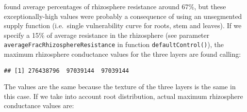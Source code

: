 \documentclass[]{book}
\newenvironment{Shaded}{\begin{snugshade}}{\end{snugshade}}
\newcommand{\KeywordTok}[1]{\textcolor[rgb]{0.13,0.29,0.53}{\textbf{#1}}}
\newcommand{\DecValTok}[1]{\textcolor[rgb]{0.00,0.00,0.81}{#1}}
\newcommand{\StringTok}[1]{\textcolor[rgb]{0.31,0.60,0.02}{#1}}
\newcommand{\OperatorTok}[1]{\textcolor[rgb]{0.81,0.36,0.00}{\textbf{#1}}}
\newcommand{\NormalTok}[1]{#1}
\begin{document}
\citet{Sperry2016a} found average percentages of rhizosphere resistance around 67\%, but these exceptionally-high values were probably a consequence of using an unsegmented supply function (i.e.~single vulnerability curve for roots, stem and leaves). If we specify a 15\% of average resistance in the rhizosphere (see parameter \texttt{averageFracRhizosphereResistance} in function \texttt{defaultControl()}), the maximum rhizosphere conductance values for the three layers are found calling:

\begin{Shaded}
\end{Shaded}

\begin{verbatim}
## [1] 276438796  97039144  97039144
\end{verbatim}

The values are the same because the texture of the three layers is the same in this case. If we take into account root distribution, actual maximum rhizosphere conductance values are:
\end{document}
